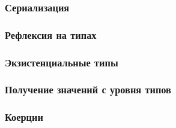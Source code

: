 
\subsubsection{Сериализация}


\subsubsection{Рефлексия на типах}

\cite{peyton2016reflection}


\subsubsection{Экзистенциальные типы} \label{subsubsec:existentials}

\cite[глава 7]{maguire-types}



\subsubsection{Получение значений с уровня типов}


\subsubsection{Коерции}

\cite{breitner2014safe}

\cite[глава 8]{maguire-types}














